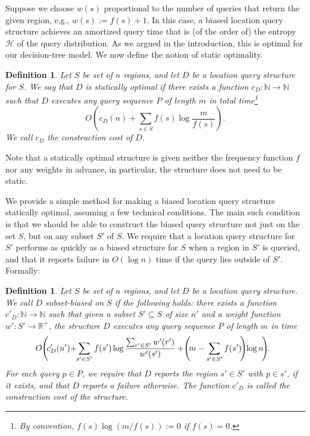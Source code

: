 \documentclass[11pt]{article}
\newtheorem{definition}[figure]{Definition}
\newcommand{\eqdef}{:=}
\begin{document}
Suppose we choose
$w(s)$ proportional to the number of queries that return the given
region, e.g., $w(s):=f(s)+1$.
In this case, a biased location query structure
achieves an amortized query time that is 
(of the order of) the entropy $\mathcal{H}$ of the query 
distribution. As we argued in the introduction, this is optimal for our
decision-tree model. We now define the notion of static optimality.

\begin{definition} \label{def:statopt}
Let $S$ be set of $n$ regions, and
let $D$ be a location query structure for $S$.
We say that $D$ is \emph{statically optimal} if 
there exists a function $c_D : \mathbb{N} \rightarrow \mathbb{N}$
such that
$D$ executes any query sequence $P$ of length $m$ 
in total time\footnote{By convention, $f(s) \log (m/f(s)) \eqdef 0$ if
$f(s) = 0$.}
\[ 
O\left(c_D(n)+ \sum_{s \in S} f(s) \log \frac{m}{f(s)} \right).
\]
We call $c_D$ the \emph{construction cost} of $D$.
\end{definition}

Note that a statically optimal structure is given neither 
the frequency function $f$ nor any weights in advance, in
particular, the structure does not need to be static.

We provide a simple method for making a biased location query
structure statically optimal, assuming a few technical
conditions. The main such condition is that we should be able to construct
the biased query structure not just on the set $S$, but on any subset 
$S'$ of $S$. We require that a location query structure 
for $S'$ performs as quickly as a biased structure for $S$ when a 
region in $S'$ is queried, and that it reports failure in $O(\log n)$ time 
if the query lies outside of $S'$.
Formally:


\begin{definition}\label{def:subset_biased}
Let $S$ be set of $n$ regions, and let $D$ be a location
query structure. We call $D$ 
\emph{subset-biased} on $S$ if the following holds:
there exists a function $c'_D : \mathbb{N} \rightarrow \mathbb{N}$
such that given a subset $S' \subseteq S$ of size $n'$ and a weight
function $w': S' \rightarrow \mathbb{R}^+$, the structure $D$ executes
any query sequence $P$ of length $m$
in time
\[
\hspace{-6pt}O\hspace{-2pt}\left(\hspace{-2pt}c'_D(n')\hspace{-2pt}+ \hspace{-3pt}
\sum_{s' \in S'} f(s') \log \frac{\sum_{r' \in S'} w'(r')}{w'(s')}  +
\hspace{-2pt} \left(\hspace{-2pt}m - \sum_{s' \in S'}
f(s')\hspace{-2pt}\right) \hspace{-2pt} \log
n\hspace{-2pt}\right)\hspace{-3pt}.
\]
For each query $p \in P$, we require that $D$ reports the
region $s' \in S'$ with $p \in s'$, if it exists, 
and that $D$ reports
a failure otherwise.
The function
$c'_D$ is called the \emph{construction cost} of the structure.  
\end{definition}
\end{document}
